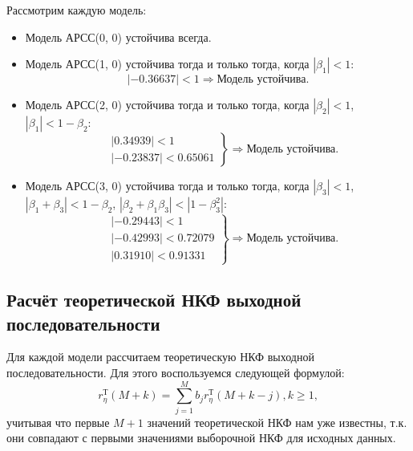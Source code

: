 \documentclass[12pt, fleqn]{article}
\begin{document}
{{		Рассмотрим каждую модель:
		\begin{itemize}
			\item {
				Модель АРСС(0, 0) устойчива всегда.
			}
			\item {
				Модель АРСС(1, 0) устойчива тогда и только тогда, когда $\left| \beta_1 \right| < 1$:
				\begin{equation*}
					\left|  -0.36637 \right| < 1 \Rightarrow \text{Модель устойчива}.
				\end{equation*}
			}
			\item {
				Модель АРСС(2, 0) устойчива тогда и только тогда, когда $\left| \beta_2 \right| < 1$, $\left| \beta_1 \right| < 1 - \beta_2$:
				\begin{equation*}
					\left.
					\begin{split}
						&\left| 0.34939 \right| < 1 \\
						&\left| -0.23837 \right| < 0.65061
					\end{split}
					\right\} \Rightarrow \text{Модель устойчива}.
				\end{equation*}
			}
			\item {		
				Модель АРСС(3, 0) устойчива тогда и только тогда, когда $\left| \beta_3 \right| < 1$, $\left| \beta_1 + \beta_3 \right| < 1 - \beta_2$, $\left| \beta_2 + \beta_1 \beta_3 \right| < \left| 1 - \beta^2_3 \right|$:
				\begin{equation*}
					\left.
					\begin{split}
						&\left| -0.29443 \right| < 1 \\
						&\left| -0.42993 \right| < 0.72079 \\
						&\left|  0.31910 \right| < 0.91331
					\end{split}
					\right\} \Rightarrow \text{Модель устойчива}.
				\end{equation*}
			}
		\end{itemize}
	}
					
	\subsection{Расчёт теоретической НКФ выходной последовательности} {
		Для каждой модели рассчитаем теоретическую НКФ выходной последовательности. Для этого воспользуемся следующей формулой:
		\begin{equation}
			r_{\eta}^{\text{Т}}(M + k) = \sum_{j=1}^{M}{b_j r_{\eta}^{\text{Т}}(M + k - j)}, k \geq 1,
		\end{equation}
		учитывая что первые $M + 1$ значений теоретической НКФ нам уже известны, т.к. они совпадают с первыми значениями выборочной НКФ для исходных данных. \medskip
				
}}
\end{document}
